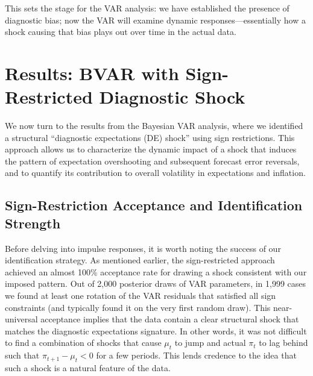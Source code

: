 \documentclass[12pt]{article}
\begin{document}
This sets the stage for the VAR analysis: we have established the presence of diagnostic bias; now the VAR will examine dynamic responses—essentially how a shock causing that bias plays out over time in the actual data.

\section{Results: BVAR with Sign-Restricted Diagnostic Shock}\label{sec:results_bvar}
We now turn to the results from the Bayesian VAR analysis, where we identified a structural “diagnostic expectations (DE) shock” using sign restrictions. This approach allows us to characterize the dynamic impact of a shock that induces the pattern of expectation overshooting and subsequent forecast error reversals, and to quantify its contribution to overall volatility in expectations and inflation.

\subsection{Sign-Restriction Acceptance and Identification Strength}
Before delving into impulse responses, it is worth noting the success of our identification strategy. As mentioned earlier, the sign-restricted approach achieved an almost 100\% acceptance rate for drawing a shock consistent with our imposed pattern. Out of 2,000 posterior draws of VAR parameters, in 1,999 cases we found at least one rotation of the VAR residuals that satisfied all sign constraints (and typically found it on the very first random draw). This near-universal acceptance implies that the data contain a clear structural shock that matches the diagnostic expectations signature. In other words, it was not difficult to find a combination of shocks that cause $\mu_t$ to jump and actual $\pi_t$ to lag behind such that $\pi_{t+1} - \mu_t < 0$ for a few periods. This lends credence to the idea that such a shock is a natural feature of the data.
\end{document}
